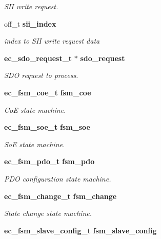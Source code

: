 \begin{DoxyCompactItemize}
\begin{DoxyCompactList}\small\item\em S\-I\-I write request. \end{DoxyCompactList}\item 
off\-\_\-t {\bf sii\-\_\-index}\label{structec__fsm__master_ad9050cec0823e4e0f4ac34effddd8d21}

\begin{DoxyCompactList}\small\item\em index to S\-I\-I write request data \end{DoxyCompactList}\item 
{\bf ec\-\_\-sdo\-\_\-request\-\_\-t} $\ast$ {\bf sdo\-\_\-request}
\begin{DoxyCompactList}\small\item\em S\-D\-O request to process. \end{DoxyCompactList}\item 
{\bf ec\-\_\-fsm\-\_\-coe\-\_\-t} {\bf fsm\-\_\-coe}\label{structec__fsm__master_a2bc8d2dd67be1dbddac6c20190e3632c}

\begin{DoxyCompactList}\small\item\em Co\-E state machine. \end{DoxyCompactList}\item 
{\bf ec\-\_\-fsm\-\_\-soe\-\_\-t} {\bf fsm\-\_\-soe}\label{structec__fsm__master_acab91592f35788b01419702634765b86}

\begin{DoxyCompactList}\small\item\em So\-E state machine. \end{DoxyCompactList}\item 
{\bf ec\-\_\-fsm\-\_\-pdo\-\_\-t} {\bf fsm\-\_\-pdo}
\begin{DoxyCompactList}\small\item\em P\-D\-O configuration state machine. \end{DoxyCompactList}\item 
{\bf ec\-\_\-fsm\-\_\-change\-\_\-t} {\bf fsm\-\_\-change}\label{structec__fsm__master_a64f30f383522a78b12151f803f39c552}

\begin{DoxyCompactList}\small\item\em State change state machine. \end{DoxyCompactList}\item 
{\bf ec\-\_\-fsm\-\_\-slave\-\_\-config\-\_\-t} {\bf fsm\-\_\-slave\-\_\-config}\label{structec__fsm__master_acd8d73f9c016a18c19eb120f8d691c62}


\end{DoxyCompactItemize}
